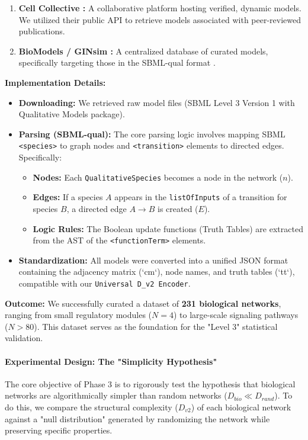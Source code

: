 \begin{enumerate}
    \item \textbf{Cell Collective \cite{helikar2012cell}:} A collaborative platform hosting verified, dynamic models. We utilized their public API to retrieve models associated with peer-reviewed publications.
    \item \textbf{BioModels / GINsim \cite{chelliah2015biomodels, naldi2009logical}:} A centralized database of curated models, specifically targeting those in the SBML-qual format \cite{chaouiya2013sbml}.
\end{enumerate}

\textbf{Implementation Details:}
\begin{itemize}
    \item \textbf{Downloading:} We retrieved raw model files (SBML Level 3 Version 1 with Qualitative Models package).
    \item \textbf{Parsing (SBML-qual):} The core parsing logic involves mapping SBML \texttt{<species>} to graph nodes and \texttt{<transition>} elements to directed edges. Specifically:
    \begin{itemize}
        \item \textbf{Nodes:} Each \texttt{QualitativeSpecies} becomes a node in the network ($n$).
        \item \textbf{Edges:} If a species $A$ appears in the \texttt{listOfInputs} of a transition for species $B$, a directed edge $A \to B$ is created ($E$).
        \item \textbf{Logic Rules:} The Boolean update functions (Truth Tables) are extracted from the AST of the \texttt{<functionTerm>} elements.
    \end{itemize}
    \item \textbf{Standardization:} All models were converted into a unified JSON format containing the adjacency matrix (`cm`), node names, and truth tables (`tt`), compatible with our \texttt{Universal D\_v2 Encoder}.
\end{itemize}

\textbf{Outcome:}
We successfully curated a dataset of \textbf{231 biological networks}, ranging from small regulatory modules ($N=4$) to large-scale signaling pathways ($N > 80$). This dataset serves as the foundation for the "Level 3" statistical validation.

\paragraph{Experimental Design: The "Simplicity Hypothesis"}
The core objective of Phase 3 is to rigorously test the hypothesis that biological networks are algorithmically simpler than random networks ($D_{bio} \ll D_{rand}$). To do this, we compare the structural complexity ($D_{v2}$) of each biological network against a "null distribution" generated by randomizing the network while preserving specific properties.

